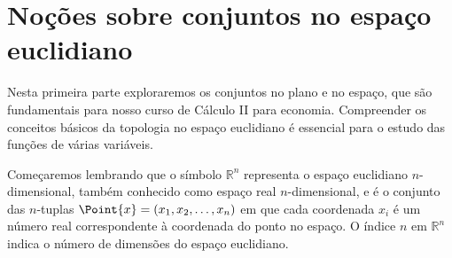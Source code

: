 \chapter{Noções sobre conjuntos no espaço euclidiano}



Nesta primeira parte exploraremos os conjuntos no plano e no espaço, que são fundamentais para nosso curso de Cálculo II para economia. Compreender os conceitos básicos da topologia no espaço euclidiano é essencial para o estudo das funções de várias variáveis. 

Começaremos lembrando que o símbolo \(\mathbb{R}^n\) representa o espaço euclidiano \(n\)-dimensional, também conhecido como espaço real \(n\)-dimensional, e é o conjunto das $n$-tuplas \(\Point{x}=(x_1, x_2, \ldots, x_n)\) em que cada coordenada \(x_i\) é um número real correspondente à coordenada do ponto no espaço. O índice \(n\) em \(\mathbb{R}^n\) indica o número de dimensões do espaço euclidiano. %



